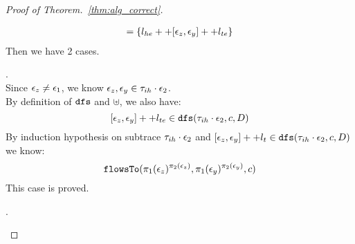 \begin{proof}[Proof of Theorem.~\ref{thm:alg_correct}]
\begin{case}
\begin{subcase}
\[\begin{array}{l}
  = \{l_{he} ++ [\mathtt{\epsilon}_z, \mathtt{\epsilon}_y] ++ l_{te}\}
\end{array}
\]
Then we have 2 cases.
\begin{subsubcase}.
%
%
\\
Since $\mathtt{\epsilon}_z \neq \mathtt{\epsilon}_1$, we know $\mathtt{\epsilon}_z, \mathtt{\epsilon}_y \in \mathtt{\tau}_{ih} \cdot \mathtt{\epsilon}_2$.
\\
By definition of $\mathtt{dfs}$ and $\uplus$,  we also have:
\[
  [\mathtt{\epsilon}_z, \mathtt{\epsilon}_y] ++ l_{te} \in \mathtt{dfs}(\mathtt{\tau}_{ih} \cdot \mathtt{\epsilon}_2, c, D) 
\]
%
%
%
By induction hypothesis on subtrace $\mathtt{\tau}_{ih} \cdot \mathtt{\epsilon}_2$ and $[\mathtt{\epsilon}_z, \mathtt{\epsilon}_y] ++ l_t 
  \in \mathtt{dfs}(\mathtt{\tau}_{ih} \cdot \mathtt{\epsilon}_2, c, D)$ we know:
\[
  \mathtt{flowsTo}(\pi_1(\mathtt{\epsilon}_z)^{\pi_2(\mathtt{\epsilon}_z)}, \pi_1(\mathtt{\epsilon}_y)^{\pi_2(\mathtt{\epsilon}_y)}, c)
\]
This case is proved.
%
\end{subsubcase}
%
\begin{subsubcase}.
\\

\end{subsubcase}
\end{subcase}
\end{case}
\end{proof}

